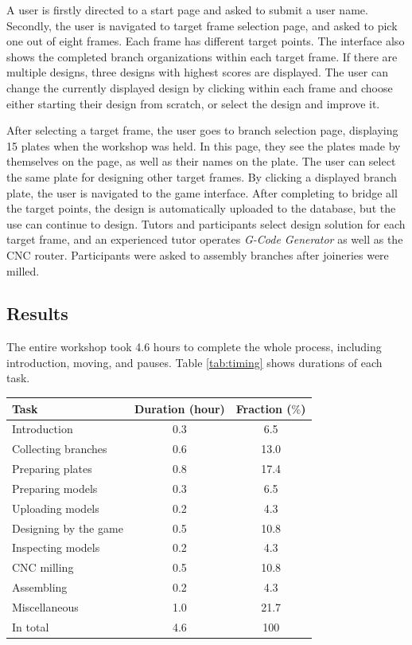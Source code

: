 A user is firstly directed to a start page and asked to submit a user name.
Secondly, the user is navigated to target frame selection page, and asked to pick one out of eight frames.
Each frame has different target points.
The interface also shows the completed branch organizations within each target frame.
If there are multiple designs, three designs with highest scores are displayed.
The user can change the currently displayed design by clicking within each frame and choose either starting their design from scratch, or select the design and improve it.

After selecting a target frame, the user goes to branch selection page, displaying 15 plates when the workshop was held.
In this page, they see the plates made by themselves on the page, as well as their names on the plate.
The user can select the same plate for designing other target frames.
By clicking a displayed branch plate, the user is navigated to the game interface.
After completing to bridge all the target points, the design is automatically uploaded to the database, but the use can continue to design.
Tutors and participants select design solution for each target frame, and an experienced tutor operates \textit{G-Code Generator} as well as the CNC router.
Participants were asked to assembly branches after joineries were milled.

\subsection{Results}
The entire workshop took 4.6 hours to complete the whole process, including introduction, moving, and pauses.
Table \ref{tab:timing} shows durations of each task.

\begin{center}
  \begin{tabulary}{\columnwidth}{ |l||C|C| }
    \hline
    Task & Duration (hour) & Fraction ($\%$) \\
    \hline
    Introduction                  & 0.3 & 6.5  \\
    Collecting branches           & 0.6 & 13.0  \\
    Preparing plates              & 0.8 & 17.4  \\
    Preparing models              & 0.3 & 6.5  \\
    Uploading models              & 0.2 & 4.3 \\
    Designing by the game         & 0.5 & 10.8 \\
    Inspecting models             & 0.2 & 4.3 \\
    CNC milling                   & 0.5 & 10.8\\
    Assembling                    & 0.2 & 4.3 \\
    Miscellaneous                 & 1.0 & 21.7 \\
    \hline
    In total                      & 4.6   & 100 \\
    \hline
  \end{tabulary}
  \label{tab:timing}
\end{center}

